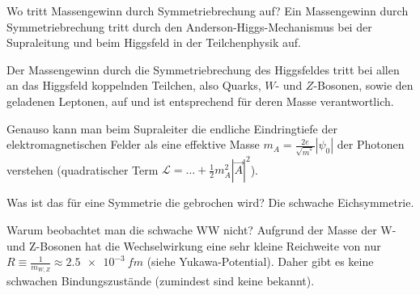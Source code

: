 \begin{fquestion}{Wo tritt Massengewinn durch Symmetriebrechung auf?}
    Ein Massengewinn durch Symmetriebrechung tritt durch den Anderson-Higgs-Mechanismus bei der Supraleitung und beim Higgsfeld in der Teilchenphysik auf.
    
    Der Massengewinn durch die Symmetriebrechung des Higgsfeldes tritt bei allen an das Higgsfeld koppelnden Teilchen, also Quarks, $W$- und $Z$-Bosonen, sowie den geladenen Leptonen, auf und ist entsprechend für deren Masse verantwortlich.
    
    Genauso kann man beim Supraleiter die endliche Eindringtiefe der elektromagnetischen Felder als eine effektive Masse $m_A = \frac{2e}{\sqrt{m^\ast}} |\psi_0|$ der Photonen verstehen (quadratischer Term $\mathcal{L} = \dots + \frac{1}{2}m_A^2|\Vec{A}|^2$).
\end{fquestion}

    

\begin{fquestion}{Was ist das für eine Symmetrie die gebrochen wird?}
    Die schwache Eichsymmetrie.
\end{fquestion}

\begin{fquestion}{Warum beobachtet man die schwache WW nicht?}
    Aufgrund der Masse der W- und Z-Bosonen hat die Wechselwirkung eine sehr kleine Reichweite von nur $R \equiv \frac{1}{m_{W,Z}}\approx \SI{2.5e-3}{fm}$ (siehe Yukawa-Potential).
    Daher gibt es keine schwachen Bindungszustände (zumindest sind keine bekannt).
\end{fquestion}


